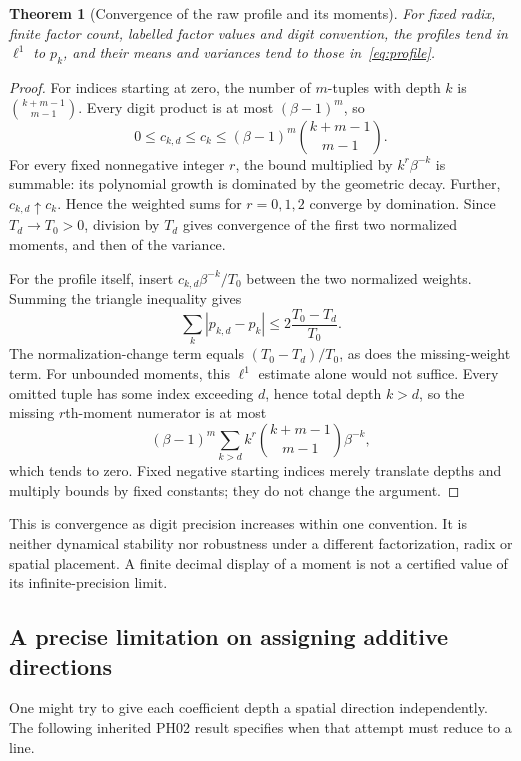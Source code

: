 \documentclass[11pt,a4paper]{article}
\newtheorem{theorem}{Theorem}[section]
\begin{document}
\begin{theorem}[Convergence of the raw profile and its moments]
For fixed radix, finite factor count, labelled factor values and digit convention, the profiles tend in $\ell^1$ to $p_k$, and their means and variances tend to those in~\eqref{eq:profile}.
\end{theorem}
\begin{proof}
For indices starting at zero, the number of $m$-tuples with depth $k$ is $\binom{k+m-1}{m-1}$. Every digit product is at most $(\beta-1)^m$, so
\begin{equation}
 0\le c_{k,d}\le c_k\le(\beta-1)^m\binom{k+m-1}{m-1}.
 \label{eq:bound}
\end{equation}
For every fixed nonnegative integer $r$, the bound multiplied by $k^r\beta^{-k}$ is summable: its polynomial growth is dominated by the geometric decay. Further, $c_{k,d}\uparrow c_k$. Hence the weighted sums for $r=0,1,2$ converge by domination. Since $T_d\to T_0>0$, division by $T_d$ gives convergence of the first two normalized moments, and then of the variance.

For the profile itself, insert $c_{k,d}\beta^{-k}/T_0$ between the two normalized weights. Summing the triangle inequality gives
\begin{equation}
 \sum_k|p_{k,d}-p_k|\le2\frac{T_0-T_d}{T_0}.
 \label{eq:l1}
\end{equation}
The normalization-change term equals $(T_0-T_d)/T_0$, as does the missing-weight term. For unbounded moments, this $\ell^1$ estimate alone would not suffice. Every omitted tuple has some index exceeding $d$, hence total depth $k>d$, so the missing $r$th-moment numerator is at most
\begin{equation}
 (\beta-1)^m\sum_{k>d}k^r\binom{k+m-1}{m-1}\beta^{-k},
 \label{eq:tail}
\end{equation}
which tends to zero. Fixed negative starting indices merely translate depths and multiply bounds by fixed constants; they do not change the argument.
\end{proof}
This is convergence as digit precision increases within one convention. It is neither dynamical stability nor robustness under a different factorization, radix or spatial placement. A finite decimal display of a moment is not a certified value of its infinite-precision limit.

\subsection{A precise limitation on assigning additive directions}
One might try to give each coefficient depth a spatial direction independently. The following inherited PH02 result specifies when that attempt must reduce to a line.
\end{document}
